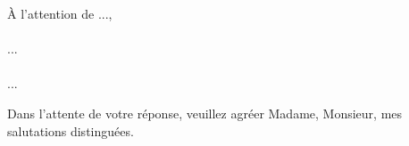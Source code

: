 \documentclass[fr]{lettertemplate}
\begin{document}
    \makeheader

    \noindent
    À l’attention de ...,

    \paragraph{}
        ...

    \paragraph{}
        ...

    \vskip 0.25cm

    \noindent
    Dans l’attente de votre réponse, veuillez agréer Madame, Monsieur, mes salutations distinguées.

    \sign
\end{document}
